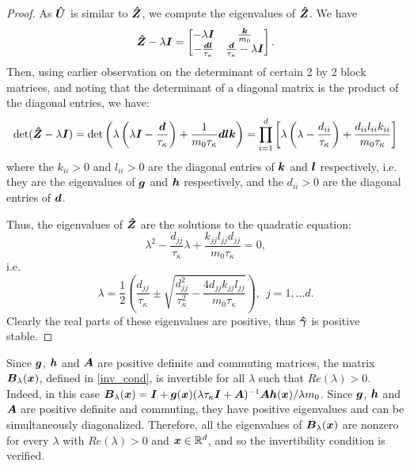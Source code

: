 \begin{proof}
As $\boldsymbol{\hat{U}}$ is similar to $\boldsymbol{\hat{Z}}$, we compute the eigenvalues of $\boldsymbol{\hat{Z}}$.      
We have 
\begin{equation}\boldsymbol{\hat{Z}}-\lambda \boldsymbol{I} = \begin{bmatrix}
       -\lambda \boldsymbol{I} & \frac{\boldsymbol{k}}{m_{0}}  \\ 
       -\frac{\boldsymbol{d} \boldsymbol{l}}{\tau_{\kappa}} & \frac{\boldsymbol{d}}{\tau_{\kappa}} - \lambda \boldsymbol{I}  \\
     \end{bmatrix}. \end{equation}
Then, using earlier observation on the determinant of certain 2 by 2 block matrices, and noting that the determinant of a diagonal matrix is the product of the diagonal entries, we have: \begin{equation}\det(\boldsymbol{\hat{Z}}-\lambda \boldsymbol{I}) = \det\left(\lambda\left(\lambda \boldsymbol{I} - \frac{\boldsymbol{d}}{\tau_{\kappa}} \right)  +\frac{1}{m_{0} \tau_{\kappa}} \boldsymbol{d} \boldsymbol{l} \boldsymbol{k} \right) = \prod_{i=1}^{d} \left[\lambda\left(\lambda - \frac{d_{ii}}{\tau_{\kappa}} \right)+\frac{d_{ii} l_{ii} k_{ii}}{m_{0} \tau_{\kappa}}  \right]\end{equation}
where the $k_{ii} > 0$ and $l_{ii} > 0$ are the diagonal entries of $\boldsymbol{k}$ and $\boldsymbol{l}$ respectively, i.e. they are the eigenvalues of $\boldsymbol{g}$ and $\boldsymbol{h}$ respectively, and the $d_{ii} > 0$ are the diagonal entries of $\boldsymbol{d}$.

Thus, the eigenvalues of $\boldsymbol{\hat{Z}}$ are the solutions to the quadratic equation: \begin{equation}\lambda^2 -  \frac{d_{jj}}{\tau_{\kappa}} \lambda + \frac{k_{jj} l_{jj} d_{jj}}{m_{0}\tau_{\kappa}} = 0,
\end{equation}
i.e. \begin{equation}\lambda = \frac{1}{2}\left(\frac{d_{jj}}{\tau_{\kappa}}\pm \sqrt{\frac{d_{jj}^2}{\tau_{\kappa}^2}-\frac{4d_{jj} k_{jj} l_{jj}}{m_{0} \tau_{\kappa} }} \right), \ \ j = 1, \dots d. \end{equation} Clearly the real parts of these eigenvalues are positive, thus $\boldsymbol{\hat{\gamma}}$ is positive stable. 
\end{proof}

\begin{remark} \label{verifycon}
Since $\boldsymbol{g}$, $\boldsymbol{h}$ and $\boldsymbol{A}$ are positive definite and commuting matrices, the matrix $\boldsymbol{B}_{\lambda}(\boldsymbol{x})$, defined in \eqref{inv_cond}, is invertible for all $\lambda$ such that $Re(\lambda) > 0$. Indeed, in this case  $\boldsymbol{B}_{\lambda}(\boldsymbol{x}) = \boldsymbol{I} + \boldsymbol{g}(\boldsymbol{x})(\lambda \tau_{\kappa} \boldsymbol{I} + \boldsymbol{A})^{-1} \boldsymbol{A} \boldsymbol{h}(\boldsymbol{x})/\lambda m_0$. Since $\boldsymbol{g}$, $\boldsymbol{h}$ and $\boldsymbol{A}$ are positive definite and commuting, they have positive eigenvalues and can be simultaneously diagonalized. Therefore, all the eigenvalues of $\boldsymbol{B}_{\lambda}(\boldsymbol{x})$ are nonzero for every $\lambda$ with $Re(\lambda) > 0$ and $\boldsymbol{x} \in \mathbb{R}^d$, and so the invertibility condition is verified.  
\end{remark}


